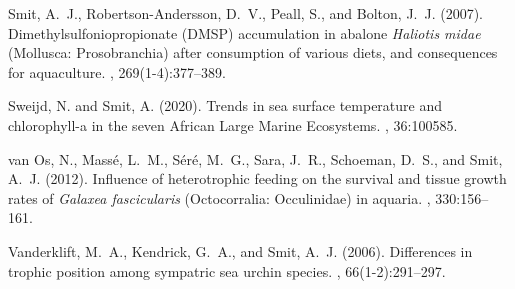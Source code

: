 \begin{thebibliography}{}
  Smit, A.~J., Robertson-Andersson, D.~V., Peall, S., and Bolton, J.~J. (2007).
  \newblock Dimethylsulfoniopropionate ({DMSP}) accumulation in abalone
    \emph{Haliotis midae} ({M}ollusca: {P}rosobranchia) after consumption of
    various diets, and consequences for aquaculture.
  , 269(1-4):377--389.
  
  Sweijd, N. and Smit, A. (2020).
  \newblock Trends in sea surface temperature and chlorophyll-a in the seven
    {A}frican {L}arge {M}arine {E}cosystems.
  , 36:100585.
  
  van Os, N., Mass{\'e}, L.~M., S{\'e}r{\'e}, M.~G., Sara, J.~R., Schoeman,
    D.~S., and Smit, A.~J. (2012).
  \newblock Influence of heterotrophic feeding on the survival and tissue growth
    rates of \emph{Galaxea fascicularis} ({O}ctocorralia: {O}cculinidae) in
    aquaria.
  , 330:156--161.
  
  Vanderklift, M.~A., Kendrick, G.~A., and Smit, A.~J. (2006).
  \newblock Differences in trophic position among sympatric sea urchin species.
  , 66(1-2):291--297.
  
\end{thebibliography}
  